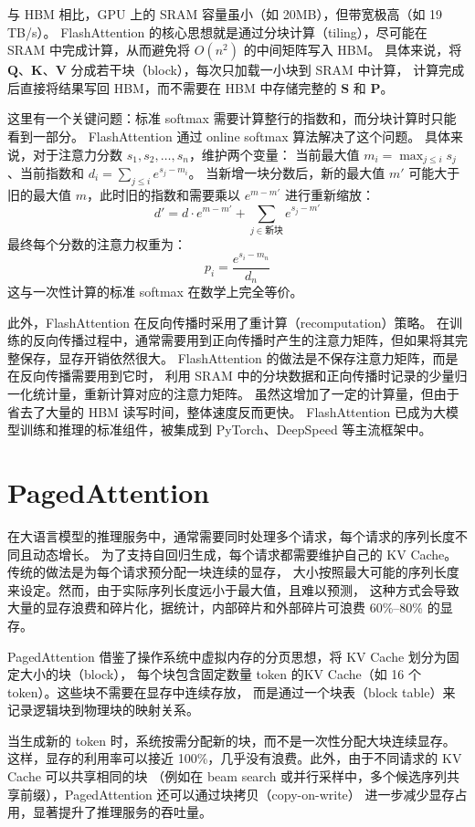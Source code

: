 与 HBM 相比，GPU 上的 SRAM 容量虽小（如 20MB），但带宽极高（如 19 TB/s）。
FlashAttention 的核心思想就是通过分块计算（tiling），尽可能在 SRAM 中完成计算，从而避免将 $O(n^2)$ 的中间矩阵写入 HBM。
具体来说，将 $\boldsymbol{Q}$、$\boldsymbol{K}$、$\boldsymbol{V}$ 分成若干块（block），每次只加载一小块到 SRAM 中计算，
计算完成后直接将结果写回 HBM，而不需要在 HBM 中存储完整的 $\boldsymbol{S}$ 和 $\boldsymbol{P}$。

这里有一个关键问题：标准 softmax 需要计算整行的指数和，而分块计算时只能看到一部分。
FlashAttention 通过 online softmax 算法解决了这个问题。
具体来说，对于注意力分数 $s_1, s_2, \ldots, s_n$，维护两个变量：
当前最大值 $m_i = \max_{j \leq i} s_j$、当前指数和 $d_i = \sum_{j \leq i} e^{s_j - m_i}$。
当新增一块分数后，新的最大值 $m'$ 可能大于旧的最大值 $m$，此时旧的指数和需要乘以 $e^{m - m'}$ 进行重新缩放：
\[
	d' = d \cdot e^{m - m'} + \sum_{j \in \text{新块}} e^{s_j - m'}
\]
最终每个分数的注意力权重为：
\[
	p_i = \frac{e^{s_i - m_n}}{d_n}
\]
这与一次性计算的标准 softmax 在数学上完全等价。

此外，FlashAttention 在反向传播时采用了重计算（recomputation）策略。
在训练的反向传播过程中，通常需要用到正向传播时产生的注意力矩阵，但如果将其完整保存，显存开销依然很大。
FlashAttention 的做法是不保存注意力矩阵，而是在反向传播需要用到它时，
利用 SRAM 中的分块数据和正向传播时记录的少量归一化统计量，重新计算对应的注意力矩阵。
虽然这增加了一定的计算量，但由于省去了大量的 HBM 读写时间，整体速度反而更快。
FlashAttention 已成为大模型训练和推理的标准组件，被集成到 PyTorch、DeepSpeed 等主流框架中。

\section{PagedAttention}
在大语言模型的推理服务中，通常需要同时处理多个请求，每个请求的序列长度不同且动态增长。
为了支持自回归生成，每个请求都需要维护自己的 KV Cache。传统的做法是为每个请求预分配一块连续的显存，
大小按照最大可能的序列长度来设定。然而，由于实际序列长度远小于最大值，且难以预测，
这种方式会导致大量的显存浪费和碎片化，据统计，内部碎片和外部碎片可浪费 60\%--80\% 的显存。

PagedAttention 借鉴了操作系统中虚拟内存的分页思想，将 KV Cache 划分为固定大小的块（block），
每个块包含固定数量 token 的KV Cache（如 16 个 token）。这些块不需要在显存中连续存放，
而是通过一个块表（block table）来记录逻辑块到物理块的映射关系。

当生成新的 token 时，系统按需分配新的块，而不是一次性分配大块连续显存。
这样，显存的利用率可以接近 100\%，几乎没有浪费。此外，由于不同请求的 KV Cache 可以共享相同的块
（例如在 beam search 或并行采样中，多个候选序列共享前缀），PagedAttention 还可以通过块拷贝（copy-on-write）
进一步减少显存占用，显著提升了推理服务的吞吐量。

